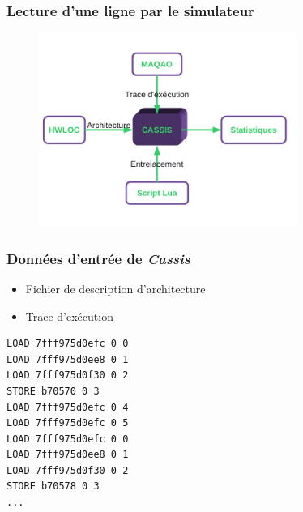 \begin{frame}
  \frametitle{Lecture d'une ligne par le simulateur}
  
  \begin{figure}[h!]
    \includegraphics[width=0.75\textwidth]{images/schema_cassis.png}
  \end{figure}
  
\end{frame}

\begin{frame}[fragile]
  \frametitle{Données d'entrée de \emph{Cassis}}
  
  
  \begin{itemize}
    \item{Fichier de description d'architecture}
    \item{Trace d'exécution}
  \end{itemize}
  
\begin{verbatim}
LOAD 7fff975d0efc 0 0
LOAD 7fff975d0ee8 0 1
LOAD 7fff975d0f30 0 2
STORE b70570 0 3
LOAD 7fff975d0efc 0 4
LOAD 7fff975d0efc 0 5
LOAD 7fff975d0efc 0 0
LOAD 7fff975d0ee8 0 1
LOAD 7fff975d0f30 0 2
STORE b70578 0 3
...
\end{verbatim}

\end{frame}

